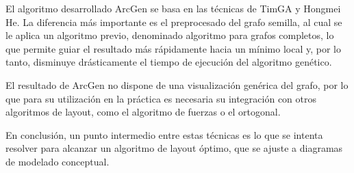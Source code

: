 El algoritmo desarrollado ArcGen se basa en las técnicas de TimGA y Hongmei He.%
La diferencia más importante es el preprocesado del grafo semilla, al cual se le aplica un algoritmo previo, denominado algoritmo para grafos completos, lo que permite guiar el resultado más rápidamente hacia un mínimo local y, por lo tanto, disminuye drásticamente el tiempo de ejecución del algoritmo genético. 

El resultado de ArcGen no dispone de una visualización genérica del grafo, por lo que para su utilización en la práctica es necesaria su integración con otros algoritmos de layout, como el algoritmo de fuerzas o el ortogonal.

En conclusión, un punto intermedio entre estas técnicas es lo que se intenta resolver para alcanzar un algoritmo de layout  óptimo, que se ajuste a  diagramas de modelado conceptual.